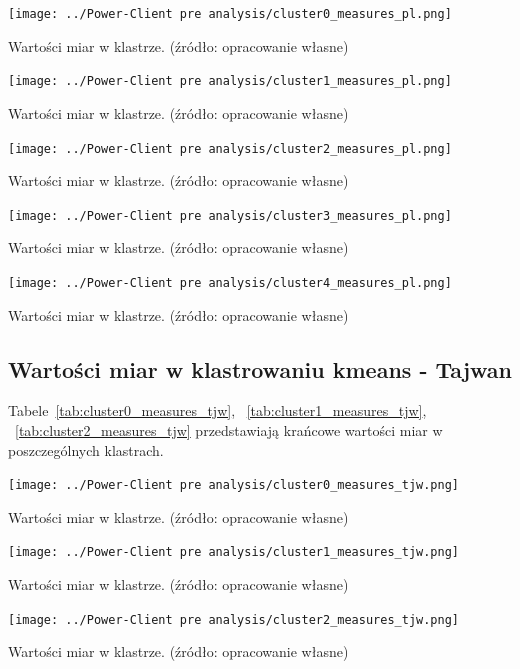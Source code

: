 \documentclass[11pt]{report}
\begin{document}
    \begin{table}[!htp]
        \centering
        \texttt{[image: ../Power-Client pre analysis/cluster0\_measures\_pl.png]}
        \caption{Wartości miar w klastrze. (źródło: opracowanie własne)}
        \label{tab:cluster0_measures_pl}
    \end{table}
    \begin{table}[!htp]
        \centering
        \texttt{[image: ../Power-Client pre analysis/cluster1\_measures\_pl.png]}
        \caption{Wartości miar w klastrze. (źródło: opracowanie własne)}
        \label{tab:cluster1_measures_pl}
    \end{table}
    \begin{table}[!htp]
        \centering
        \texttt{[image: ../Power-Client pre analysis/cluster2\_measures\_pl.png]}
        \caption{Wartości miar w klastrze. (źródło: opracowanie własne)}
        \label{tab:cluster2_measures_pl}
    \end{table}
    \begin{table}[!htp]
        \centering
        \texttt{[image: ../Power-Client pre analysis/cluster3\_measures\_pl.png]}
        \caption{Wartości miar w klastrze. (źródło: opracowanie własne)}
        \label{tab:cluster3_measures_pl}
    \end{table}
    \begin{table}[!htp]
        \centering
        \texttt{[image: ../Power-Client pre analysis/cluster4\_measures\_pl.png]}
        \caption{Wartości miar w klastrze. (źródło: opracowanie własne)}
        \label{tab:cluster4_measures_pl}
    \end{table}

    \subsection{Wartości miar w klastrowaniu kmeans - Tajwan}\label{subsec:wartości-miar-w-klastrowaniu-kmeans---tajwan}

    Tabele~\ref{tab:cluster0_measures_tjw},
    ~\ref{tab:cluster1_measures_tjw},
    ~\ref{tab:cluster2_measures_tjw}
    przedstawiają krańcowe wartości miar w poszczególnych klastrach.

    \begin{table}[!htp]
        \centering
        \texttt{[image: ../Power-Client pre analysis/cluster0\_measures\_tjw.png]}
        \caption{Wartości miar w klastrze. (źródło: opracowanie własne)}
        \label{tab:cluster0_measures_tjw}
    \end{table}
    \begin{table}[!htp]
        \centering
        \texttt{[image: ../Power-Client pre analysis/cluster1\_measures\_tjw.png]}
        \caption{Wartości miar w klastrze. (źródło: opracowanie własne)}
        \label{tab:cluster1_measures_tjw}
    \end{table}
    \begin{table}[!htp]
        \centering
        \texttt{[image: ../Power-Client pre analysis/cluster2\_measures\_tjw.png]}
        \caption{Wartości miar w klastrze. (źródło: opracowanie własne)}
        \label{tab:cluster2_measures_tjw}
    \end{table}
\end{document}
